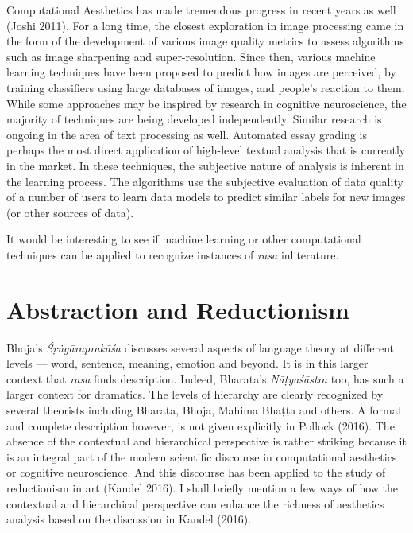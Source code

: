 Computational Aesthetics has made tremendous progress in recent years as well (Joshi 2011). For a long time, the closest exploration in image processing came in the form of the development of various image quality metrics to assess algorithms such as image sharpening and super-resolution. Since then, various machine learning techniques have been proposed to predict how images are perceived, by training classifiers using large databases of images, and people’s reaction to them. While some approaches may be inspired by research in cognitive neuroscience, the majority of techniques are being developed independently. Similar research is ongoing in the area of text processing as well. Automated essay grading is perhaps the most direct application of high-level textual analysis that is currently in the market. In these techniques, the subjective nature of analysis is inherent in the learning process. The algorithms use the subjective evaluation of data quality of a number of users to learn data models to predict similar labels for new images (or other sources of data).

It would be interesting to see if machine learning or other computational techniques can be applied to recognize instances of \textsl{rasa} in\break literature.\\[-14pt]

\section*{Abstraction and Reductionism}

Bhoja’s \textsl{Śṛṅgāraprakāśa} discusses several aspects of language theory at different levels --- word, sentence, meaning, emotion and beyond. It is in this larger context that \textsl{rasa} finds description. Indeed, Bharata’s \textsl{Nāṭyaśāstra}  too, has such a larger context for dramatics. The levels of hierarchy are clearly recognized by several theorists including Bharata, Bhoja, Mahima Bhaṭṭa and others. A formal and complete description however, is not given explicitly in Pollock (2016). The absence of the contextual and hierarchical perspective is rather striking because it is an integral part of the modern scientific discourse in computational aesthetics or cognitive neuroscience. And this discourse has been applied to the study of reductionism in art (Kandel 2016). I shall briefly mention a few ways of how the contextual and hierarchical perspective can enhance the richness of aesthetics analysis based on the discussion in Kandel (2016).

